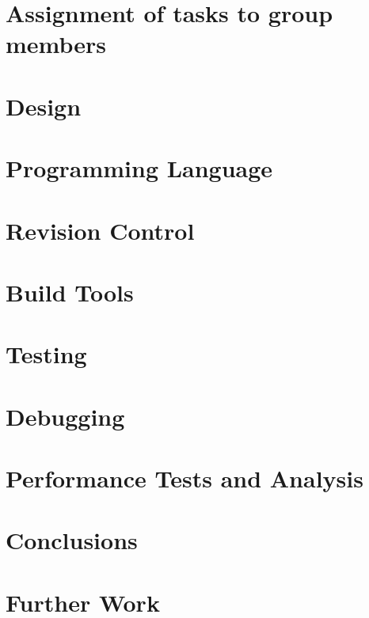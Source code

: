 \documentclass[12pt,a4paper]{article}
\begin{document}
%
%

\section{Assignment of tasks to group members}
\label{Assignment of tasks to group members}

%
%

\section{Design}
\label{Design}
%
%

\section{Programming Language}
\label{Programming Language}
%
%

\section{Revision Control}
\label{Revision Control}
%
%

\section{Build Tools}
\label{Build Tools}
%
%

\section{Testing}
\label{Testing}
%
%

\section{Debugging}
\label{Debugging}
%
%

\section{Performance Tests and Analysis}
\label{Performance Tests and Analysis}
%
%

\section{Conclusions}
\label{Conclusions}
%
%

\section{Further Work}
\label{Further Work}
\end{document}
